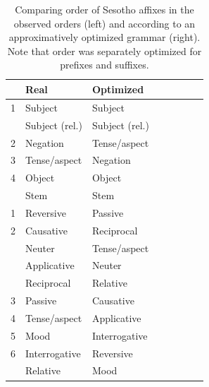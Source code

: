 \begin{table}
    \centering
    \begin{tabular}{llllllll}
	    &	    Real & Optimized \\ \hline\hline
	    1 & Subject & Subject \\
	      & Subject (rel.) & Subject (rel.) \\
	    2 & Negation & Tense/aspect \\
	    3& Tense/aspect & Negation \\
	    4 &Object & Object \\ \hline
	    &Stem & Stem  \\ \hline
	    1 & Reversive & Passive \\
	    2& Causative & Reciprocal \\
	    &Neuter & Tense/aspect \\
	    &Applicative & Neuter \\
	    &Reciprocal & Relative \\
	    3&Passive & Causative \\
	    4&Tense/aspect & Applicative \\
	    5&Mood & Interrogative \\
	    6&Interrogative & Reversive \\
	    &Relative & Mood \\ \hline
    \end{tabular}
	\caption{Comparing order of Sesotho affixes in the observed orders (left) and according to an approximatively optimized grammar (right). Note that order was separately optimized for prefixes and suffixes.}
    \label{tab:grammar-table-sesotho}
\end{table}












